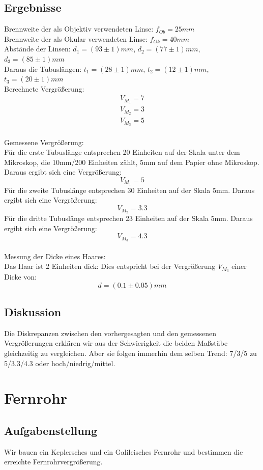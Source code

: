 \documentclass{article}
\begin{document}
\subsection{Ergebnisse}
Brennweite der als Objektiv verwendeten Linse: $f_{Ob}=25mm$\\
Brennweite der als Okular verwendeten Linse: $f_{Ok}=40mm$\\
Abstände der Linsen: $d_1=(93 \pm 1)mm$, $d_2=(77 \pm 1)mm$, $d_3=(85 \pm 1)mm$\\
Daraus die Tubuslängen: $t_1=(28 \pm 1)mm$, $t_2=(12 \pm 1)mm$, $t_3=(20 \pm 1)mm$ \\
Berechnete Vergrößerung: 
\begin{gather*}
V_{M_1}=7\\
V_{M_2}=3\\
V_{M_3}=5
\end{gather*}
\\
Gemessene Vergrößerung:\\
Für die erste Tubuslänge entsprechen 20 Einheiten auf der Skala  unter dem Mikroskop, die 10mm/200 Einheiten zählt, 5mm auf dem Papier ohne Mikroskop. Daraus ergibt sich eine Vergrößerung: $$\boxed{V_{M_1}=5}$$
Für die zweite Tubuslänge entsprechen 30 Einheiten auf der Skala  5mm. Daraus ergibt sich eine Vergrößerung: $$\boxed{V_{M_2}=3.3}$$
Für die dritte Tubuslänge entsprechen 23 Einheiten auf der Skala  5mm. Daraus ergibt sich eine Vergrößerung: $$\boxed{V_{M_3}=4.3}$$
\\
Messung der Dicke eines Haares:\\
Das Haar ist 2 Einheiten dick: Dies entspricht bei der Vergrößerung $V_{M_3}$ einer Dicke von: 
$$\boxed{d=(0.1 \pm 0.05)mm}$$
\subsection{Diskussion}
Die Diskrepanzen zwischen den vorhergesagten und den gemessenen Vergrößerungen erklären wir aus der Schwierigkeit die beiden Maßstäbe gleichzeitig zu vergleichen. Aber sie folgen immerhin dem selben Trend: 7/3/5 zu 5/3.3/4.3 oder hoch/niedrig/mittel. 
\section{Fernrohr}
\subsection{Aufgabenstellung}
Wir bauen ein Keplersches und ein Galileisches Fernrohr und bestimmen die erreichte Fernrohrvergrößerung.
\end{document}
